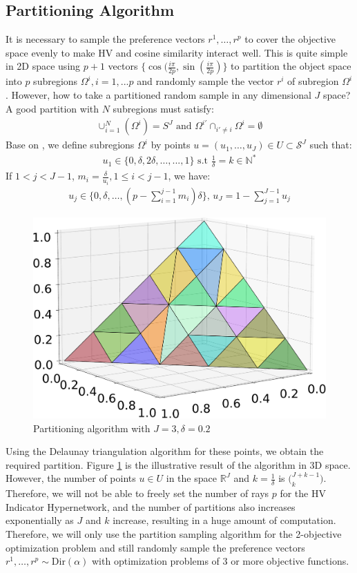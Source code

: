 \documentclass[letterpaper]{article} %
\begin{document}
\subsection{Partitioning Algorithm}
\label{sst:partition}
It is necessary to sample the preference vectors $r^1,\dots, r^p$ to cover the objective space evenly to make HV and cosine similarity interact well. This is quite simple in 2D space using $p+1$ vectors $\{\cos(\frac{i\pi}{2p}, \sin(\frac{i\pi}{2p}) \}$ to partition the object space into $p$ subregions $\Omega^i, i=1,...p$ and randomly sample the vector $r^i$ of subregion $\Omega^i$. However, how to take a partitioned random sample in any dimensional $J$ space? A good partition with $N$ subregions must satisfy:
\begin{align}
\cup_{i=1}^N (\Omega^i)= S^J \text{ and }  \Omega^{i'} \cap_{i' \neq i} \Omega^i = \emptyset
\end{align}
Base on \cite{das}, we define subregions $\Omega^i$ by points $u=(u_1, \dots, u_J) \in U \subset \mathcal{S}^J$ such that:
\begin{align}
u_1 \in \{0, \delta, 2\delta, \dots, ..., 1\} \text{ s.t }  \frac{1}{\delta}=k \in \mathbb{N}^*
\end{align}
If $1<j<J-1$, $m_i = \frac{\delta}{u_i}, 1 \leq i<j-1$, we have:
\begin{align}
u_j \in \{0, \delta, \dots, (p-\sum_{i=1}^{j-1}m_i)\delta\} \text{, }  u_J = 1 - \sum_{j=1}^{J-1}u_j
\end{align}
\begin{figure}[!htb]
\centering
\includegraphics[width=0.8\columnwidth]{figures/Partition_resize.pdf}
\caption{Partitioning algorithm with $J=3, \delta=0.2$}
\label{fig:partition_result}
\end{figure}
Using the Delaunay triangulation algorithm \cite{Edelsbrunner1985VoronoiDA} for these points, we obtain the required partition. Figure \ref{fig:partition_result} is the illustrative result of the algorithm in 3D space. However, the number of points $u \in U$ in the space $\mathbb{R}^J$ and $k = \frac{1}{\delta}$ is $\Big (^{J+k-1}_k \Big)$. Therefore, we will not be able to freely set the number of rays $p$ for the HV Indicator Hypernetwork, and the number of partitions also increases exponentially as $J$ and $k$ increase, resulting in a huge amount of computation. Therefore, we will only use the partition sampling algorithm for the 2-objective optimization problem and still randomly sample the preference vectors $r^1, \dots, r^p \sim \text{Dir}(\alpha)$ with optimization problems of 3 or more objective functions.
\end{document}
